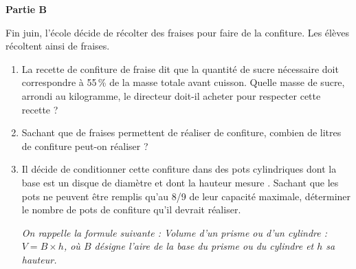    \vskip2mm
   {\bf Partie B} \par \smallskip
   Fin juin, l’école décide de récolter des fraises pour faire de la confiture. Les élèves récoltent ainsi  de fraises.
   \begin{enumerate}
      \setlength{\itemsep}{-1mm}
      \item La recette de confiture de fraise dit que la quantité de sucre nécessaire doit correspondre à 55\,\% de la masse totale avant cuisson. Quelle masse de sucre, arrondi au kilogramme, le directeur doit-il acheter pour respecter cette recette ?
      \item Sachant que  de fraises permettent de réaliser  de confiture, combien de litres de confiture peut-on réaliser ?
      \item Il décide de conditionner cette confiture dans des pots cylindriques dont la base est un disque de diamètre  et dont la hauteur mesure . Sachant que les pots ne peuvent être remplis qu’au 8/9 de leur capacité maximale, déterminer le nombre de pots de confiture qu’il devrait réaliser. \par
        {\it On rappelle la formule suivante : Volume d'un prisme ou d'un cylindre : $V=B\times h$, \newline
        où $B$ désigne l’aire de la base du prisme ou du cylindre et $h$ sa hauteur.}
   \end{enumerate}